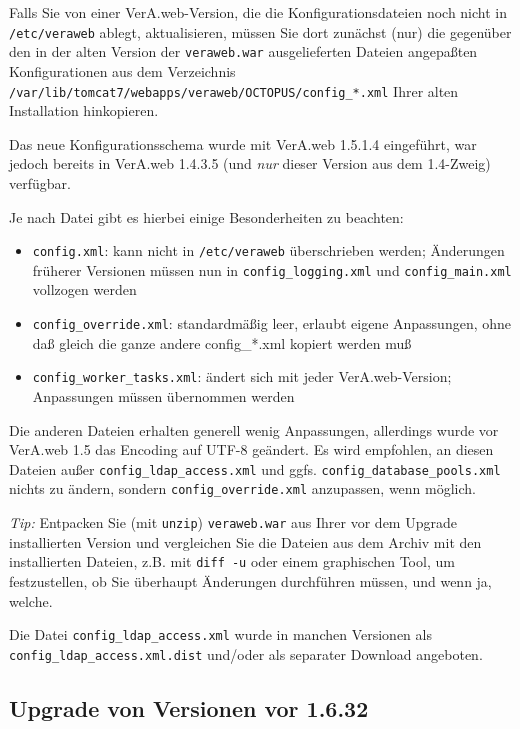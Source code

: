 Falls Sie von einer VerA.web-Version, die die Konfigurationsdateien noch
nicht in \texttt{/etc/veraweb} ablegt, aktualisieren, müssen Sie dort
zunächst (nur) die gegenüber den in der alten Version der \texttt{veraweb.war}
ausgelieferten Dateien angepaßten Konfigurationen aus dem Verzeichnis
\texttt{/var/lib/tomcat7/webapps/veraweb/OCTOPUS/config\_*.xml}
Ihrer alten Installation hinkopieren.

Das neue Konfigurationsschema wurde mit VerA.web 1.5.1.4 eingeführt,
war jedoch bereits in VerA.web 1.4.3.5 (und \emph{nur} dieser Version
aus dem 1.4-Zweig) verfügbar.

Je nach Datei gibt es hierbei einige Besonderheiten zu beachten:\keinumbruch

\begin{itemize}
 \item{\texttt{config.xml}: kann nicht in \texttt{/etc/veraweb}
  überschrieben werden; Änderungen früherer Versionen müssen nun
  in \texttt{config\_logging.xml} und \texttt{config\_main.xml}
  vollzogen werden}
 \item{\texttt{config\_override.xml}: standardmäßig leer, erlaubt
  eigene Anpassungen, ohne daß gleich die ganze andere config\_*.xml
  kopiert werden muß}
 \item{\texttt{config\_worker\_tasks.xml}: ändert sich mit jeder
  VerA.web-Version; Anpassungen müssen übernommen werden}
\end{itemize}

Die anderen Dateien erhalten generell wenig Anpassungen, allerdings
wurde vor VerA.web 1.5 das Encoding auf UTF-8 geändert. Es wird
empfohlen, an diesen Dateien \dash außer \texttt{config\_ldap\_access.xml}
und ggfs. \texttt{config\_database\_pools.xml} \dash nichts zu ändern,
sondern \texttt{config\_override.xml} anzupassen, wenn möglich.

\emph{Tip:} Entpacken Sie (mit \texttt{unzip}) \texttt{veraweb.war}
aus Ihrer vor dem Upgrade installierten Version und vergleichen Sie
die Dateien aus dem Archiv mit den installierten Dateien, z.B. mit
\texttt{diff -u} oder einem graphischen Tool, um festzustellen, ob
Sie überhaupt Änderungen durchführen müssen, und wenn ja, welche.

Die Datei \texttt{config\_ldap\_access.xml} wurde in manchen
Versionen als \texttt{config\_ldap\_access.xml.dist} und/oder
als separater Download angeboten.
\fi%

\subsection{Upgrade von Versionen vor 1.6.32}\label{subsec:upgrade-1632}

